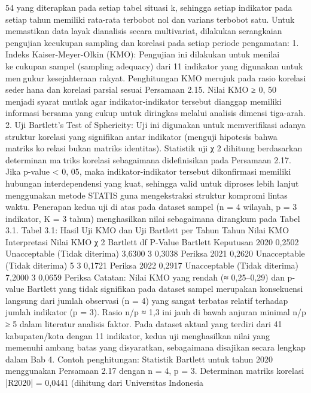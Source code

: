 54
yang diterapkan pada setiap tabel situasi k, sehingga setiap indikator pada setiap
tahun memiliki rata-rata terbobot nol dan varians terbobot satu.
Untuk memastikan data layak dianalisis secara multivariat, dilakukan serangkaian
pengujian kecukupan sampling dan korelasi pada setiap periode pengamatan:
1. Indeks Kaiser-Meyer-Olkin (KMO): Pengujian ini dilakukan untuk menilai kecukupan sampel (sampling adequacy) dari 11 indikator yang digunakan untuk mengukur kesejahteraan rakyat. Penghitungan KMO merujuk pada rasio korelasi sederhana dan korelasi parsial sesuai Persamaan 2.15. Nilai KMO ≥ 0, 50 menjadi syarat
mutlak agar indikator-indikator tersebut dianggap memiliki informasi bersama yang
cukup untuk diringkas melalui analisis dimensi tiga-arah.
2. Uji Bartlett’s Test of Sphericity: Uji ini digunakan untuk memverifikasi adanya
struktur korelasi yang signifikan antar indikator (menguji hipotesis bahwa matriks korelasi bukan matriks identitas). Statistik uji χ
2 dihitung berdasarkan determinan matriks korelasi sebagaimana didefinisikan pada Persamaan 2.17. Jika p-value < 0, 05,
maka indikator-indikator tersebut dikonfirmasi memiliki hubungan interdependensi
yang kuat, sehingga valid untuk diproses lebih lanjut menggunakan metode STATIS
guna mengekstraksi struktur kompromi lintas waktu.
Penerapan kedua uji di atas pada dataset sampel (n = 4 wilayah, p = 3 indikator,
K = 3 tahun) menghasilkan nilai sebagaimana dirangkum pada Tabel 3.1.
Tabel 3.1: Hasil Uji KMO dan Uji Bartlett per Tahun
Tahun Nilai KMO Interpretasi Nilai KMO χ
2 Bartlett df P-Value Bartlett Keputusan
2020 0,2502 Unacceptable (Tidak diterima) 3,6300 3 0,3038 Periksa
2021 0,2620 Unacceptable (Tidak diterima) 5 3 0,1721 Periksa
2022 0,2917 Unacceptable (Tidak diterima) 7,2000 3 0,0659 Periksa
Catatan: Nilai KMO yang rendah (≈ 0,25–0,29) dan p-value Bartlett yang tidak signifikan
pada dataset sampel merupakan konsekuensi langsung dari jumlah observasi (n = 4)
yang sangat terbatas relatif terhadap jumlah indikator (p = 3). Rasio n/p ≈ 1,3 ini jauh
di bawah anjuran minimal n/p ≥ 5 dalam literatur analisis faktor. Pada dataset aktual
yang terdiri dari 41 kabupaten/kota dengan 11 indikator, kedua uji menghasilkan nilai
yang memenuhi ambang batas yang disyaratkan, sebagaimana disajikan secara lengkap
dalam Bab 4.
Contoh penghitungan: Statistik Bartlett untuk tahun 2020 menggunakan Persamaan 2.17
dengan n = 4, p = 3. Determinan matriks korelasi |R2020| = 0,0441 (dihitung dari
Universitas Indonesia

